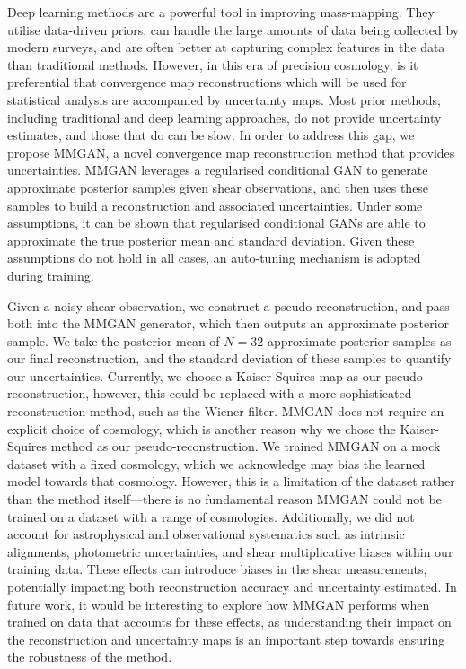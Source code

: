 \documentclass[fleqn,usenatbib]{mnras}
\begin{document}
Deep learning methods are a powerful tool in improving mass-mapping. They utilise data-driven priors, can handle the large amounts of data being collected by modern surveys, and are often better at capturing complex features in the data than traditional methods. However, in this era of precision cosmology, is it preferential that convergence map reconstructions which will be used for statistical analysis are accompanied by uncertainty maps. Most prior methods, including traditional and deep learning approaches, do not provide uncertainty estimates, and those that do can be slow. In order to address this gap, we propose MMGAN, a novel convergence map reconstruction method that provides uncertainties. MMGAN leverages a regularised conditional GAN to generate approximate posterior samples given shear observations, and then uses these samples to build a reconstruction and associated uncertainties. Under some assumptions, it can be shown that regularised conditional GANs are able to approximate the true posterior mean and standard deviation. Given these assumptions do not hold in all cases, an auto-tuning mechanism is adopted during training. 

Given a noisy shear observation, we construct a pseudo-reconstruction, and pass both into the MMGAN generator, which then outputs an approximate posterior sample. We take the posterior mean of $N=32$ approximate posterior samples as our final reconstruction, and the standard deviation of these samples to quantify our uncertainties. Currently, we choose a Kaiser-Squires map as our pseudo-reconstruction, however, this could be replaced with a more sophisticated reconstruction method, such as the Wiener filter. MMGAN does not require an explicit choice of cosmology, which is another reason why we chose the Kaiser-Squires method as our pseudo-reconstruction. We trained MMGAN on a mock dataset with a fixed cosmology, which we acknowledge may bias the learned model towards that cosmology. However, this is a limitation of the dataset rather than the method itself---there is no fundamental reason MMGAN could not be trained on a dataset with a range of cosmologies. Additionally, we did not account for astrophysical and observational systematics such as intrinsic alignments, photometric uncertainties, and shear multiplicative biases within our training data. These effects can introduce biases in the shear measurements, potentially impacting both reconstruction accuracy and uncertainty estimated. In future work, it would be interesting to explore how MMGAN performs when trained on data that accounts for these effects, as understanding their impact on the reconstruction and uncertainty maps is an important step towards ensuring the robustness of the method.
\end{document}
